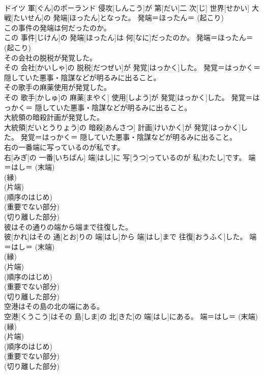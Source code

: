 \documentclass[8pt]{extreport}
\begin{document}
\begin{CJK}{UTF8}{min}
{\\	ドイツ 軍[ぐん]のポーランド 侵攻[しんこう]が 第[だい]二 次[じ] 世界[せかい] 大戦[たいせん]の 発端[ほったん]となった。	発端＝ほったん＝ (起こり) 
\\	この事件の発端は何だったのか。	
\\	この 事件[じけん]の 発端[ほったん]は 何[なに]だったのか。	発端＝ほったん＝ (起こり) 
\\	その会社の脱税が発覚した。	
\\	その 会社[かいしゃ]の 脱税[だつぜい]が 発覚[はっかく]した。	発覚＝はっかく＝ 隠していた悪事・陰謀などが明るみに出ること。
\\	その歌手の麻薬使用が発覚した。	
\\	その 歌手[かしゅ]の 麻薬[まやく] 使用[しよう]が 発覚[はっかく]した。	発覚＝はっかく＝ 隠していた悪事・陰謀などが明るみに出ること。
\\	大統領の暗殺計画が発覚した。	
\\	大統領[だいとうりょう]の 暗殺[あんさつ] 計画[けいかく]が 発覚[はっかく]した。	発覚＝はっかく＝ 隠していた悪事・陰謀などが明るみに出ること。
\\	右の一番端に写っているのが私です。	
\\	右[みぎ]の 一番[いちばん] 端[はし]に 写[うつ]っているのが 私[わたし]です。	端＝はし＝ (末端) 
\\	(縁) 
\\	(片端) 
\\	(順序のはじめ) 
\\	(重要でない部分) 
\\	(切り離した部分) 
\\	彼はその通りの端から端まで往復した。	
\\	彼[かれ]はその 通[とお]りの 端[はし]から 端[はし]まで 往復[おうふく]した。	端＝はし＝ (末端) 
\\	(縁) 
\\	(片端) 
\\	(順序のはじめ) 
\\	(重要でない部分) 
\\	(切り離した部分) 
\\	空港はその島の北の端にある。	
\\	空港[くうこう]はその 島[しま]の 北[きた]の 端[はし]にある。	端＝はし＝ (末端) 
\\	(縁) 
\\	(片端) 
\\	(順序のはじめ) 
\\	(重要でない部分) 
\\	(切り離した部分) 
}
\end{CJK}
\end{document}
